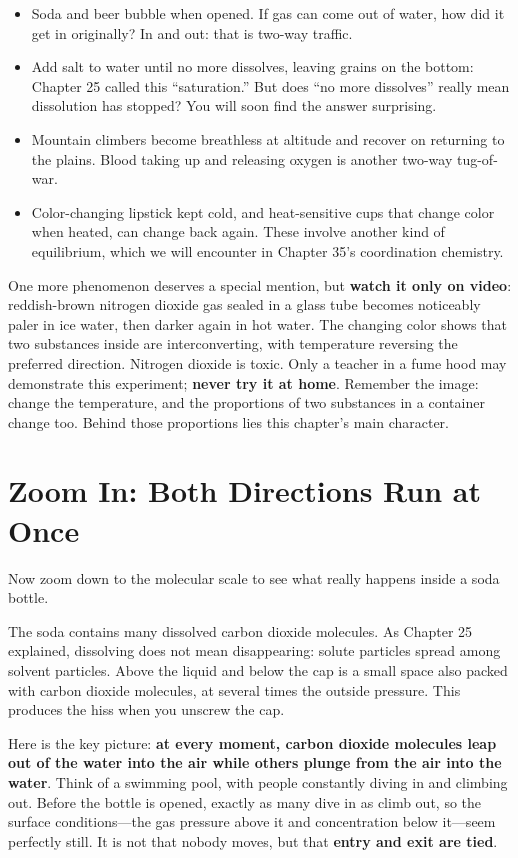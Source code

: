\begin{itemize}[itemsep=2pt]
\item Soda and beer bubble when opened. If gas can come out of water, how did it get in originally? In and out: that is two-way traffic.
\item Add salt to water until no more dissolves, leaving grains on the bottom: Chapter 25 called this ``saturation.'' But does ``no more dissolves'' really mean dissolution has stopped? You will soon find the answer surprising.
\item Mountain climbers become breathless at altitude and recover on returning to the plains. Blood taking up and releasing oxygen is another two-way tug-of-war.
\item Color-changing lipstick kept cold, and heat-sensitive cups that change color when heated, can change back again. These involve another kind of equilibrium, which we will encounter in Chapter 35's coordination chemistry.
\end{itemize}

One more phenomenon deserves a special mention, but \textbf{watch it only on video}: reddish-brown nitrogen dioxide gas sealed in a glass tube becomes noticeably paler in ice water, then darker again in hot water. The changing color shows that two substances inside are interconverting, with temperature reversing the preferred direction. Nitrogen dioxide is toxic. Only a teacher in a fume hood may demonstrate this experiment; \textbf{never try it at home}. Remember the image: change the temperature, and the proportions of two substances in a container change too. Behind those proportions lies this chapter's main character.

\section{Zoom In: Both Directions Run at Once}

Now zoom down to the molecular scale to see what really happens inside a soda bottle.

The soda contains many dissolved carbon dioxide molecules. As Chapter 25 explained, dissolving does not mean disappearing: solute particles spread among solvent particles. Above the liquid and below the cap is a small space also packed with carbon dioxide molecules, at several times the outside pressure. This produces the hiss when you unscrew the cap.

Here is the key picture: \textbf{at every moment, carbon dioxide molecules leap out of the water into the air while others plunge from the air into the water}. Think of a swimming pool, with people constantly diving in and climbing out. Before the bottle is opened, exactly as many dive in as climb out, so the surface conditions---the gas pressure above it and concentration below it---seem perfectly still. It is not that nobody moves, but that \textbf{entry and exit are tied}.

